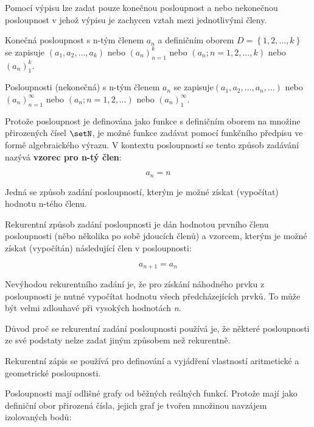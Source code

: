 

Pomocí výpisu lze zadat pouze konečnou posloupnost a nebo nekonečnou posloupnost v jehož výpisu je zachycen vztah mezi jednotlivými členy. 

Konečná posloupnost s n-tým členem $a_n$ a definičním oborem $D=\left\{1, 2, …, k\right\}$ se zapisuje $(a_1, a_2, …, a_k)$ nebo $(a_n)^{k}_{n=1}$ nebo  $(a_n ; n = 1, 2, …, k)$ nebo $(a_n)^{k}_{1}$.

Posloupnosti (nekonečná) s n-tým členem $a_n$ se zapisuje\odradkovat $\left(a_1, a_2, …, a_n, …\right)$ nebo $(a_n)^{\infty}_{n=1}$ nebo $(a_n ; n = 1, 2, …)$ nebo $(a_n)^{\infty}_{1}$. 


Protože posloupnost je definována jako funkce s definičním oborem na množine přirozených čísel $\setN$, je možné funkce zadávat pomocí funkčního předpisu ve formě algebraického výrazu. V kontextu posloupností se tento způsob zadávání nazývá {\bf vzorec pro n-tý člen}:

$$a_n = n $$

Jedná se způsob zadání posloupností, kterým je možné získat (vypočítat) hodnotu n-tého členu.


Rekurentní způsob zadání posloupnosti je dán hodnotou prvního členu posloupnosti (něbo několika po sobě jdoucích členů) a vzorcem, kterým je možné získat (vypočítán) následující člen v posloupnosti:

$$ a_{n+1} = a_n $$

Nevýhodou rekurentního zadání je, že pro získání náhodného prvku z posloupnosti je nutné vypočítat hodnotu všech předcházejících prvků. To může být velmi zdlouhavé při vysokých hodnotách {\it n}. 

Důvod proč se rekurentní zadání posloupnosti používá je, že některé posloupnosti ze své podstaty nelze zadat jiným způsobem než rekurentně.

Rekurentní zápis se používá pro definování a vyjádření vlastností aritmetické a geometrické posloupnosti.


Posloupnosti mají odlišné grafy od běžných reálných funkcí. Protože mají jako definiční obor přirozená čísla, jejich graf je tvořen množinou navzájem izolovaných bodů:

\vskip 4mm
\centerline{}
\vskip 4mm

